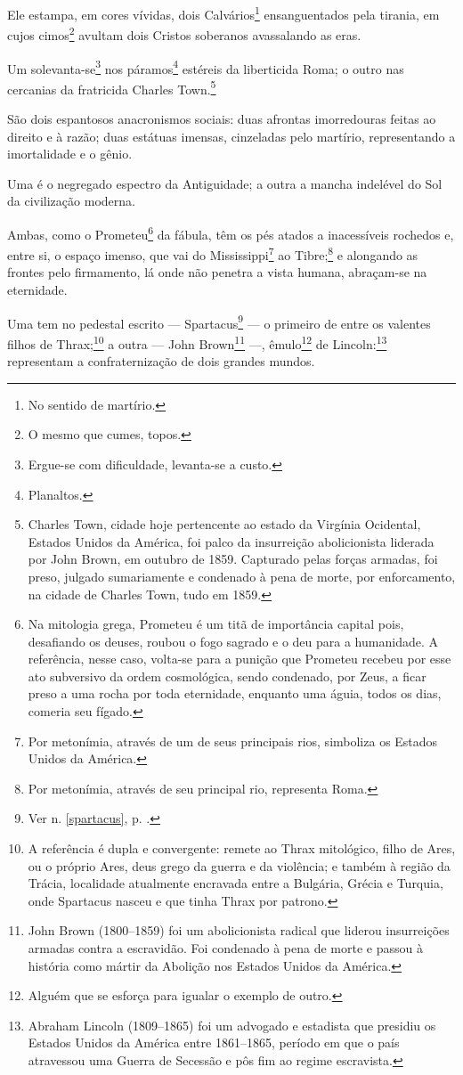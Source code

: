 Ele estampa, em cores vívidas, dois Calvários\footnote{No sentido de
  martírio.} ensanguentados pela tirania, em cujos cimos\footnote{O
  mesmo que cumes, topos.} avultam dois Cristos soberanos avassalando as
eras.

Um solevanta-se\footnote{Ergue-se com dificuldade, levanta-se a custo.}
nos páramos\footnote{Planaltos.} estéreis da liberticida Roma; o outro
nas cercanias da fratricida Charles Town.\footnote{Charles Town, cidade
  hoje pertencente ao estado da Virgínia Ocidental, Estados Unidos da
  América, foi palco da insurreição abolicionista liderada por John
  Brown, em outubro de 1859. Capturado pelas forças armadas, foi preso,
  julgado sumariamente e condenado à pena de morte, por enforcamento, na
  cidade de Charles Town, tudo em 1859.}

São dois espantosos anacronismos sociais: duas afrontas imorredouras
feitas ao direito e à razão; duas estátuas imensas, cinzeladas pelo
martírio, representando a imortalidade e o gênio.

Uma é o negregado espectro da Antiguidade; a outra a mancha indelével do
Sol da civilização moderna.

Ambas, como o Prometeu\footnote{Na mitologia grega, Prometeu é um titã
  de importância capital pois, desafiando os deuses, roubou o fogo
  sagrado e o deu para a humanidade. A referência, nesse caso, volta-se
  para a punição que Prometeu recebeu por esse ato subversivo da ordem
  cosmológica, sendo condenado, por Zeus, a ficar preso a uma rocha por
  toda eternidade, enquanto uma águia, todos os dias, comeria seu
  fígado.} da fábula, têm os pés atados a inacessíveis rochedos e, entre
si, o espaço imenso, que vai do Mississippi\footnote{Por metonímia,
  através de um de seus principais rios, simboliza os Estados Unidos da
  América.} ao Tibre;\footnote{Por metonímia, através de seu principal
  rio, representa Roma.} e alongando as frontes pelo firmamento, lá
onde não penetra a vista humana, abraçam-se na eternidade.

Uma tem no pedestal escrito --- Spartacus\footnote{Ver n. \ref{spartacus}, p. \pageref{spartacus}.} 
--- o primeiro de entre os valentes filhos de
Thrax;\footnote{A referência é dupla e convergente: remete ao Thrax
  mitológico, filho de Ares, ou o próprio Ares, deus grego da guerra e
  da violência; e também à região da Trácia, localidade atualmente
  encravada entre a Bulgária, Grécia e Turquia, onde Spartacus nasceu e
  que tinha Thrax por patrono.} a outra --- John Brown\footnote{John
  Brown (1800--1859) foi um abolicionista radical que liderou
  insurreições armadas contra a escravidão. Foi condenado à pena de
  morte e passou à história como mártir da Abolição nos Estados Unidos
  da América.} ---, êmulo\footnote{Alguém que se esforça para igualar o
  exemplo de outro.} de Lincoln:\footnote{Abraham Lincoln (1809--1865)
  foi um advogado e estadista que presidiu os Estados Unidos da América
  entre 1861--1865, período em que o país atravessou uma Guerra de
  Secessão e pôs fim ao regime escravista.\label{lincoln}} representam a
confraternização de dois grandes mundos.

